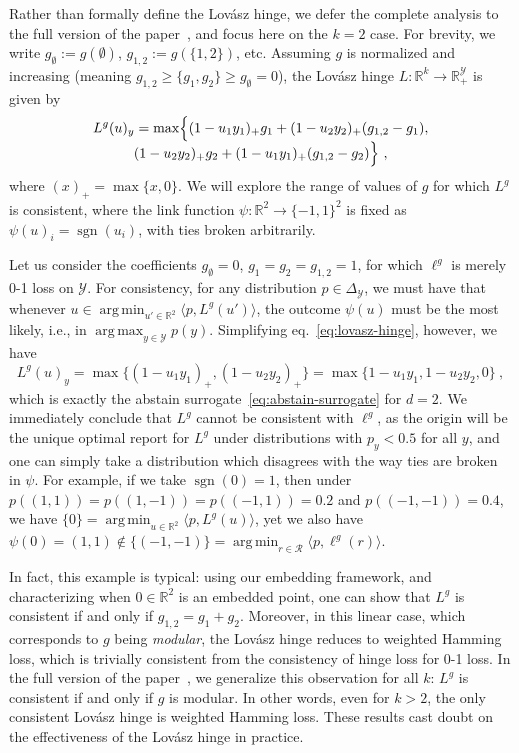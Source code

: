 \documentclass[11pt]{article}
\newcommand{\Comments}{1}
\newcommand{\mytodo}[2]{\ifnum\Comments=1%
  \todo[linecolor=#1!80!black,backgroundcolor=#1,bordercolor=#1!80!black]{#2}\fi}
\newcommand{\raft}[1]{\mytodo{green!20!white}{RF: #1}}
\newcommand{\reals}{\mathbb{R}}
\newcommand{\simplex}{\Delta_\Y}
\newcommand{\R}{\mathcal{R}}
\newcommand{\Y}{\mathcal{Y}}
\newcommand{\inprod}[2]{\langle #1, #2 \rangle}%
\DeclareMathOperator*{\argmax}{arg\,max}
\DeclareMathOperator*{\argmin}{arg\,min}
\DeclareMathOperator*{\sgn}{sgn}
\begin{document}
Rather than formally define the Lov\'asz hinge, we defer the complete analysis to the full version of the paper~\cite{finocchiaro2019embedding}, and focus here on the $k=2$ case.
For brevity, we write $g_\emptyset := g(\emptyset)$, $g_{1,2} := g(\{1,2\})$, etc.
Assuming $g$ is normalized and increasing (meaning $g_{1,2} \geq \{g_1,g_2\} \geq g_\emptyset = 0$), the Lov\'asz hinge $L:\reals^k\to\reals^\Y_+$ is given by
\begin{multline}
  \label{eq:lovasz-hinge}
  L^g(u)_y = \max\Bigl\{(1-u_1y_1)_+ g_1 + (1-u_2y_2)_+ (g_{1,2}-g_1),\\[-4pt] (1-u_2y_2)_+ g_2 + (1-u_1y_1)_+ (g_{1,2}-g_2)\Bigr\}~,
\end{multline}
where $(x)_+ = \max\{x,0\}$.
We will explore the range of values of $g$ for which $L^g$ is consistent, where the link function $\psi:\reals^2\to\{-1,1\}^2$ is fixed as $\psi(u)_i = \sgn(u_i)$, with ties broken arbitrarily.

Let us consider the coefficients $g_\emptyset = 0$, $g_1 = g_2 = g_{1,2} = 1$, for which $\ell^g$ is merely 0-1 loss on $\Y$.
For consistency, for any distribution $p\in\simplex$, we must have that whenever $u \in \argmin_{u'\in\reals^2} \inprod{p}{L^g(u')}$, the outcome $\psi(u)$ must be the most likely, i.e., in $\argmax_{y\in\Y} p(y)$.
Simplifying eq.~\eqref{eq:lovasz-hinge}, however, we have
\begin{equation}
  \label{eq:lovasz-hinge-abstain}
  L^g(u)_y = \max\bigl\{(1-u_1y_1)_+,(1-u_2y_2)_+\bigr\} = \max\bigl\{1-u_1y_1,1-u_2y_2,0\bigr\}~,
\end{equation}
which is exactly the abstain surrogate~\eqref{eq:abstain-surrogate} for $d=2$.
We immediately conclude that $L^g$ cannot be consistent with $\ell^g$, as the origin will be the unique optimal report for $L^g$ under distributions with $p_y < 0.5$ for all $y$, and one can simply take a distribution which disagrees with the way ties are broken in $\psi$.
For example, if we take $\sgn(0) = 1$, then under $p((1,1)) = p((1,-1)) = p((-1,1)) = 0.2$ and $p((-1,-1)) = 0.4$, we have $\{0\} = \argmin_{u\in\reals^2} \inprod{p}{L^g(u)}$, yet we also have $\psi(0) = (1,1) \notin \{(-1,-1)\} = \argmin_{r\in\R} \inprod{p}{\ell^g(r)}$.

In fact, this example is typical: using our embedding framework, and characterizing when $0\in\reals^2$ is an embedded point, one can show that $L^g$ is consistent if and only if $g_{1,2} = g_1 + g_2$.
Moreover, in this linear case, which corresponds to $g$ being \emph{modular}, the Lov\'asz hinge reduces to weighted Hamming loss, which is trivially consistent from the consistency of hinge loss for 0-1 loss.
In the full version of the paper~\cite{finocchiaro2019embedding}, we generalize this observation for all $k$: $L^g$ is consistent if and only if $g$ is modular.
In other words, even for $k>2$, the only consistent Lov\'asz hinge is weighted Hamming loss.
These results cast doubt on the effectiveness of the Lov\'asz hinge in practice.
\end{document}
